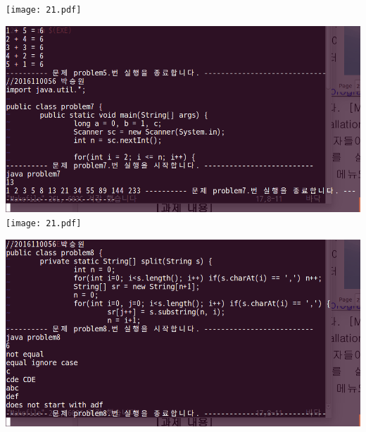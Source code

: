 \documentclass[12pt,a4paper]{article}
\begin{document}
\texttt{[image: 21.pdf]}

\includegraphics[width=\textwidth]{problem7.png}
\texttt{[image: 21.pdf]}

\includegraphics[width=\textwidth]{problem8.png}
\end{document}
